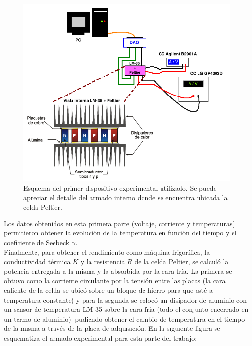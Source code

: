 \documentclass[twoside,twocolumn,a4paper]{article}
\begin{document}
\begin{figure}[H]
\includegraphics[width=\linewidth]{dispexp.jpg}
\caption{Esquema del primer dispositivo experimental utilizado. Se puede apreciar el detalle del armado interno donde se encuentra ubicada la celda Peltier.}
\label{fig:dispexp}
\end{figure}

Los datos obtenidos en esta primera parte (voltaje, corriente y temperaturas) permitieron obtener la evoluci\'on de la temperatura en funci\'on del tiempo y el coeficiente de Seebeck $\alpha$.\\

Finalmente, para obtener el rendimiento como m\'aquina frigor\'ifica, la conductividad t\'ermica $K$ y la resistencia $R$ de la celda Peltier, se calcul\'o la potencia entregada a la misma y la absorbida por la cara fr\'ia. La primera se obtuvo como la corriente circulante por la tensi\'on entre las placas (la cara caliente de la celda se ubic\'o sobre un bloque de hierro para que est\'e a temperatura constante) y para la segunda se coloc\'o un disipador de aluminio con un sensor de temperatura LM-35 sobre la cara fr\'ia (todo el conjunto encerrado en un termo de aluminio), pudiendo obtener el cambio de temperatura en el tiempo de la misma a trav\'es de la placa de adquisici\'on. En la siguiente figura se esquematiza el armado experimental para esta parte del trabajo:
\end{document}
